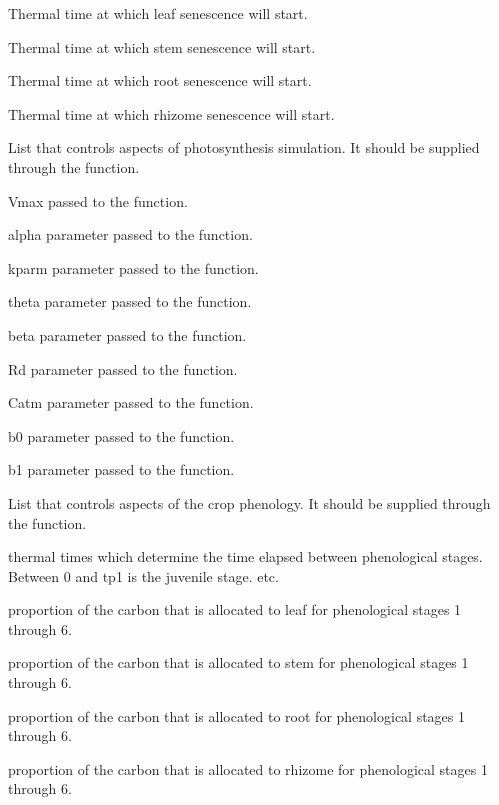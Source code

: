 \documentclass[letterpaper]{book}
\begin{document}
\begin{Arguments}
\begin{ldescription}
 Thermal time at which leaf senescence will
start.

 Thermal time at which stem senescence will
start.

 Thermal time at which root senescence will
start.

 Thermal time at which rhizome
senescence will start.

\item[\code{photoControl}] List that controls aspects of
photosynthesis simulation. It should be supplied through
the  function.

 Vmax passed to the 
function.

 alpha parameter passed to the
 function.

 kparm parameter passed to the
 function.

 theta parameter passed to the
 function.

 beta parameter passed to the
 function.

 Rd parameter passed to the
 function.

 Catm parameter passed to the
 function.

 b0 parameter passed to the
 function.

 b1 parameter passed to the
 function.

\item[\code{phenoControl}] List that controls aspects of the
crop phenology. It should be supplied through the
 function.

 thermal times which determine the time
elapsed between phenological stages. Between 0 and tp1 is
the juvenile stage. etc.

 proportion of the carbon that is
allocated to leaf for phenological stages 1 through 6.

 proportion of the carbon that is
allocated to stem for phenological stages 1 through 6.

 proportion of the carbon that is
allocated to root for phenological stages 1 through 6.

 proportion of the carbon that is
allocated to rhizome for phenological stages 1 through 6.


\end{ldescription}
\end{Arguments}
\end{document}
